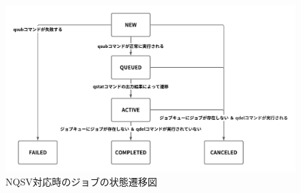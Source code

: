 \begin{figure}[tb]
    \centering
    \includegraphics[width=120mm]{./fig/state_change_diagram.png}
    \caption{NQSV対応時のジョブの状態遷移図}
    \label{state_change_diagram}
\end{figure}

